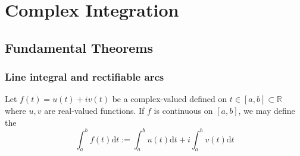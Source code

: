 \section{Complex Integration}
\subsection{Fundamental Theorems}
\subsubsection{Line integral and rectifiable arcs}
Let  $ f(t)=u(t)+iv(t) $ be a complex-valued defined on  $ t\in[a,b]\subset\mathbb{R} $ where $ u,v $ are real-valued functions.
If  $ f $ is continuous on  $ [a,b] $, we may define the 
\[\int_a^bf(t)\mathrm{d}t:=\int_a^bu(t)\mathrm{d}t+i\int_a^bv(t)\mathrm{d}t\]   

